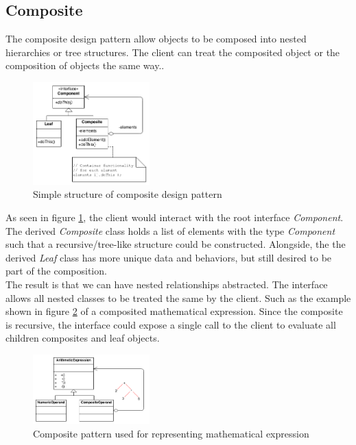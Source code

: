 \iftwocolumns
\begin{multicols}{2}
\fi

\subsection{Composite}
The composite design pattern allow objects to be composed into nested hierarchies or tree structures. The client can treat the composited object or the composition of objects the same way.\cite{sm-composite}.

\begin{figure}[H]
	\centering
	\includegraphics[width=0.4\textwidth]{assets/composite-sm}
	\caption{Simple structure of composite design pattern\cite{sm-composite}}
	\label{fig:composite}
\end{figure}

As seen in figure \ref{fig:composite}, the client would interact with the root interface \textit{Component}. The derived \textit{Composite} class holds a list of elements with the type \textit{Component} such that a recursive/tree-like structure could be constructed. Alongside, the the derived \textit{Leaf} class has more unique data and behaviors, but still desired to be part of the composition.\bs
\\
The result is that we can have nested relationships abstracted. The interface allows all nested classes to be treated the same by the client. Such as the example shown in figure \ref{fig:composite-arith} of a composited mathematical expression. Since the composite is recursive, the interface could expose a single call to the client to evaluate all children composites and leaf objects.\bs
\\
\begin{figure}[H]
	\centering
	\includegraphics[width=0.4\textwidth]{assets/composite-arith}
	\caption{Composite pattern used for representing mathematical expression\cite{sm-composite}}
	\label{fig:composite-arith}
\end{figure}


\end{multicols}
